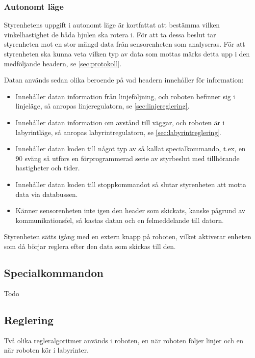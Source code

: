 \subsubsection{Autonomt läge}

Styrenhetens uppgift i autonomt läge är kortfattat att bestämma vilken vinkelhastighet de båda hjulen ska rotera i. 
För att ta dessa beslut tar styrenheten mot en stor mängd data från sensorenheten som analyseras.
För att styrenheten ska kunna veta vilken typ av data som mottas märks detta upp i den
medföljande headern, se \ref{sec:protokoll}. 

Datan används sedan olika beroende på vad headern innehåller för information:
 
 \begin{itemize}
 
\item Innehåller datan information från linjeföljning, och roboten befinner sig i linjeläge, 
så anropas linjeregulatorn, se \ref{sec:linjereglering}.

\item Innehåller datan information om avstånd till väggar, och roboten är i labyrintläge,
 så anropas labyrintregulatorn, se \ref{sec:labyrintreglering}.

\item Innehåller datan koden till något typ av så kallat specialkommando, t.ex, en 90\degree 
sväng så utförs en förprogrammerad serie av styrbeslut med tillhörande hastigheter och tider.

\item Innehåller datan koden till stoppkommandot så slutar styrenheten att motta data via databussen.

\item Känner sensorenheten inte igen den header som skickats, kanske pågrund av kommunikationsfel,
så kastas datan och en felmeddelande till datorn.

\end{itemize}

Styrenheten sätts igång med en extern knapp på roboten, vilket aktiverar enheten som då börjar
reglera efter den data som skickas till den.

\subsection{Specialkommandon}
Todo

\subsection{Reglering}
Två olika regleralgoritmer används i roboten, en när roboten följer linjer och
en när roboten kör i labyrinter.
